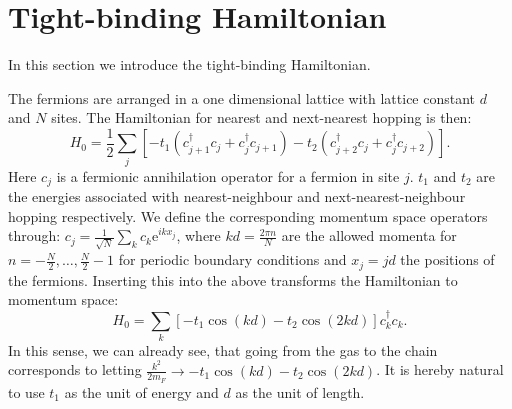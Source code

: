 \section{Tight-binding Hamiltonian} \label{sec.TightbindingHam.lattice}
In this section we introduce the tight-binding Hamiltonian. 

The fermions are arranged in a one dimensional lattice with lattice constant $d$ and $N$ sites. The Hamiltonian for nearest and next-nearest hopping is then:
\begin{equation}
H_{0} = \frac{1}{2}\sum_{j} \left[- t_1(c^\dagger_{j+1}c_j + c^\dagger_j c_{j + 1}) - t_2(c^\dagger_{j + 2}c_j + c^\dagger_j c_{j + 2}) \right].
\label{eq.Htightbindingrealspace} 
\end{equation}
Here $c_j$ is a fermionic annihilation operator for a fermion in site $j$. $t_1$ and $t_2$ are the energies associated with nearest-neighbour and next-nearest-neighbour hopping respectively. We define the corresponding momentum space operators through: $c_j = \frac{1}{\sqrt{N}}\sum_{k} c_k \text{e}^{ikx_j}$, where $kd = \frac{2\pi n}{N}$ are the allowed momenta for $n = -\frac{N}{2}, \dots, \frac{N}{2} - 1$ for periodic boundary conditions and $x_j = jd$ the positions of the fermions. Inserting this into the above transforms the Hamiltonian to momentum space:
\begin{equation}
H_{0} = \sum_k \left[ - t_1\cos(kd) - t_2\cos(2kd)\right]c^\dagger_kc_k.
\label{eq.Htightbindingmomentumspace} 
\end{equation}
In this sense, we can already see, that going from the gas to the chain corresponds to letting $\frac{k^2}{2m_F} \to - t_1\cos(kd) - t_2\cos(2kd)$. It is hereby natural to use $t_1$ as the unit of energy and $d$ as the unit of length.


